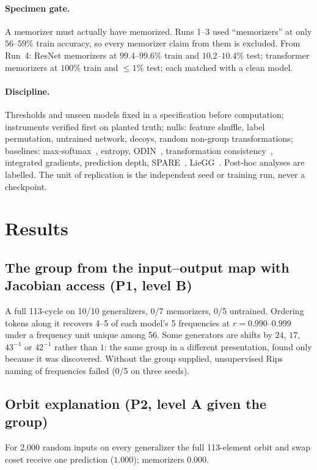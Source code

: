 \documentclass[11pt]{article}
\begin{document}
\paragraph{Specimen gate.} A memorizer must actually have memorized. Runs 1--3 used ``memorizers'' at only $56$--$59\%$ train accuracy, so every memorizer claim from them is excluded. From Run~4: ResNet memorizers at $99.4$--$99.6\%$ train and $10.2$--$10.4\%$ test; transformer memorizers at $100\%$ train and $\le1\%$ test; each matched with a clean model.
\paragraph{Discipline.} Thresholds and unseen models fixed in a specification before computation; instruments verified first on planted truth; nulls: feature shuffle, label permutation, untrained network, decoys, random non-group transformations; baselines: max-softmax~\cite{hendrycks2017}, entropy, ODIN~\cite{liang2018}, transformation consistency~\cite{golan2018}, integrated gradients, prediction depth, SPARE~\cite{spare}, LieGG~\cite{lieg}. Post-hoc analyses are labelled. The unit of replication is the independent seed or training run, never a checkpoint.

\section{Results}

\subsection{The group from the input--output map with Jacobian access (P1, level B)}
A full 113-cycle on 10/10 generalizers, 0/7 memorizers, 0/5 untrained. Ordering tokens along it recovers 4--5 of each model's 5 frequencies at $r=0.990$--$0.999$ under a frequency unit unique among 56. Some generators are shifts by $24$, $17$, $43^{-1}$ or $42^{-1}$ rather than $1$: the same group in a different presentation, found only because it was discovered. Without the group supplied, unsupervised Rips naming of frequencies failed (0/5 on three seeds).

\subsection{Orbit explanation (P2, level A given the group)}
For 2{,}000 random inputs on every generalizer the full 113-element orbit and swap coset receive one prediction ($1.000$); memorizers $0.000$.
\end{document}
